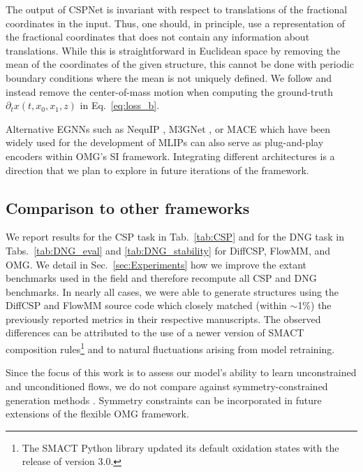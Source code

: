 The output of CSPNet is invariant with respect to translations of the fractional coordinates in the input. Thus, one should, in principle, use a representation of the fractional coordinates that does not contain any information about translations. While this is straightforward in Euclidean space by removing the mean of the coordinates of the given structure, this cannot be done with periodic boundary conditions where the mean is not uniquely defined. We follow \citet{miller_flowmm_2024} and instead remove the center-of-mass motion when computing the ground-truth $\partial_tx(t,x_0,x_1,z)$ in Eq.~\ref{eq:loss_b}.

Alternative EGNNs such as NequIP \citep{batzner_e3equivariant_2022}, M3GNet \citep{chen_universal_2022}, or MACE \citep{batatia_mace_2022} which have been widely used for the development of MLIPs can also serve as plug-and-play encoders within OMG's SI framework.  Integrating different architectures is a direction that we plan to explore in future iterations of the framework.

%

\subsection{Comparison to other frameworks}

We report results for the CSP task in Tab.~\ref{tab:CSP} and for the DNG task in Tabs.~\ref{tab:DNG_eval} and \ref{tab:DNG_stability} for DiffCSP, FlowMM, and OMG. We detail in Sec.~\ref{sec:Experiments} how we improve the extant benchmarks used in the field and therefore recompute all CSP and DNG benchmarks.
In nearly all cases, we were able to generate structures using the DiffCSP and FlowMM source code which closely matched (within $\sim$1\%) the previously reported metrics in their respective manuscripts.
The observed differences can be attributed to the use of a newer version of SMACT composition rules\footnote{The SMACT Python library updated its default oxidation states with the release of version 3.0.} \citep{davies_smact_2019} and to natural fluctuations arising from model retraining.

Since the focus of this work is to assess our model's ability to learn unconstrained and unconditioned flows, we do not compare against symmetry-constrained generation methods \citep{ai4science_crystalgfn_2023, cao_space_2024, zhu_wycryst_2024, kazeev_wyckofftransformer_2024, jiao_space_2024}. Symmetry constraints can be incorporated in future extensions of the flexible OMG framework.

